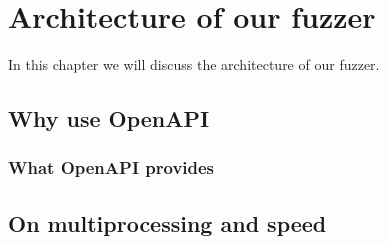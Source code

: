 \chapter{Architecture of our fuzzer}
In this chapter we will discuss the architecture of our fuzzer.

\section{Why use OpenAPI}
\subsection{What OpenAPI provides}
\section{On multiprocessing and speed}
